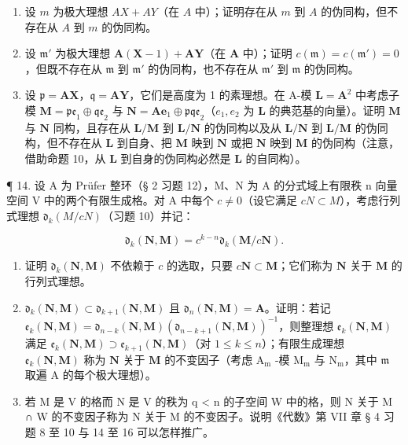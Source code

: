 \begin{enumerate}
\def\labelenumi{(\alph{enumi})}
\item
  设 \(m\) 为极大理想 \(AX + AY\)（在 \(A\) 中）；证明存在从 \(m\) 到 \(A\) 的伪同构，但不存在从 \(A\) 到 \(m\) 的伪同构。
\item
  设 \(\mathfrak{m}'\) 为极大理想 \(\mathbf{A}(\mathbf{X} - 1) + \mathbf{A}\mathbf{Y}\)（在 \(\mathbf{A}\) 中）；证明 \(c(\mathfrak{m}) = c(\mathfrak{m}') = 0\)，但既不存在从 \(\mathfrak{m}\) 到 \(\mathfrak{m}'\) 的伪同构，也不存在从 \(\mathfrak{m}'\) 到 \(\mathfrak{m}\) 的伪同构。
\item
  设 \(\mathfrak{p} = \mathbf{AX}\)，\(\mathfrak{q} = \mathbf{AY}\)，它们是高度为 1 的素理想。在 A-模 \(\mathbf{L} = \mathbf{A}^2\) 中考虑子模 \(\mathbf{M} = \mathfrak{pe}_1 \oplus \mathfrak{qe}_2\) 与 \(\mathbf{N} = \mathbf{Ae}_1 \oplus \mathfrak{pqe}_2\)（\(e_1, e_2\) 为 \(\mathbf{L}\) 的典范基的向量）。证明 \(\mathbf{M}\) 与 \(\mathbf{N}\) 同构，且存在从 \(\mathbf{L} / \mathbf{M}\) 到 \(\mathbf{L} / \mathbf{N}\) 的伪同构以及从 \(\mathbf{L} / \mathbf{N}\) 到 \(\mathbf{L} / \mathbf{M}\) 的伪同构，但不存在从 \(\mathbf{L}\) 到自身、把 \(\mathbf{M}\) 映到 \(\mathbf{N}\) 或把 \(\mathbf{N}\) 映到 \(\mathbf{M}\) 的伪同构（注意，借助命题 10，从 \(\mathbf{L}\) 到自身的伪同构必然是 \(\mathbf{L}\) 的自同构）。
\end{enumerate}

¶ 14. 设 A 为 Prüfer 整环（§ 2 习题 12），M、N 为 A 的分式域上有限秩 n 向量空间 V 中的两个有限生成格。对 A 中每个 \(c \neq 0\)（设它满足 \(cN \subset M\)），考虑行列式理想 \(\mathfrak{d}_{k}(M/cN)\)（习题 10）并记：

\[
\mathfrak {d} _ {k} (\mathbf {N}, \mathbf {M}) = c ^ {k - n} \mathfrak {d} _ {k} (\mathbf {M} / c \mathbf {N}).
\]

\begin{enumerate}
\def\labelenumi{(\alph{enumi})}
\item
  证明 \(\mathfrak{d}_k(\mathbf{N},\mathbf{M})\) 不依赖于 \(c\) 的选取，只要 \(c\mathbf{N}\subset \mathbf{M}\)；它们称为 \(\mathbf{N}\) 关于 \(\mathbf{M}\) 的行列式理想。
\item
  \(\mathfrak{d}_k(\mathbf{N},\mathbf{M})\subset \mathfrak{d}_{k + 1}(\mathbf{N},\mathbf{M})\) 且 \(\mathfrak{d}_n(\mathbf{N},\mathbf{M}) = \mathbf{A}\)。证明：若记 \(\mathfrak{e}_k(\mathbf{N},\mathbf{M}) = \mathfrak{d}_{n - k}(\mathbf{N},\mathbf{M})(\mathfrak{d}_{n - k + 1}(\mathbf{N},\mathbf{M}))^{-1}\)，则整理想 \(\mathfrak{e}_k(\mathbf{N},\mathbf{M})\) 满足 \(\mathfrak{e}_k(\mathbf{N},\mathbf{M})\supset \mathfrak{e}_{k + 1}(\mathbf{N},\mathbf{M})\)（对 \(1\leqslant k\leqslant n\)）；有限生成理想 \(\mathfrak{e}_k(\mathbf{N},\mathbf{M})\) 称为 \(\mathbf{N}\) 关于 \(\mathbf{M}\) 的不变因子（考虑 \(\mathrm{A_m}\) -模 \(\mathrm{M_m}\) 与 \(\mathrm{N_m}\)，其中 \(\mathfrak{m}\) 取遍 \(\mathrm{A}\) 的每个极大理想）。
\item
  若 M 是 V 的格而 N 是 V 的秩为 q \textless{} n 的子空间 W 中的格，则 N 关于 M ∩ W 的不变因子称为 N 关于 M 的不变因子。说明《代数》第 VII 章 § 4 习题 8 至 10 与 14 至 16 可以怎样推广。
\end{enumerate}

